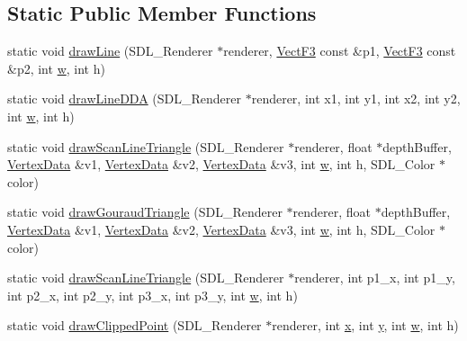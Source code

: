 \subsection*{Static Public Member Functions}
\begin{DoxyCompactItemize}
\item 
static void \hyperlink{classDrawSDLUtils_aadfa83b37031fa98575ac3bff7952865}{draw\-Line} (S\-D\-L\-\_\-\-Renderer $\ast$renderer, \hyperlink{classVectF3}{Vect\-F3} const \&p1, \hyperlink{classVectF3}{Vect\-F3} const \&p2, int \hyperlink{VectF4_8h_a56eca241e2896b9f57a79589e76fd24b}{w}, int h)
\item 
static void \hyperlink{classDrawSDLUtils_a22a6a39770fb2e7a11d66711cebf73c6}{draw\-Line\-D\-D\-A} (S\-D\-L\-\_\-\-Renderer $\ast$renderer, int x1, int y1, int x2, int y2, int \hyperlink{VectF4_8h_a56eca241e2896b9f57a79589e76fd24b}{w}, int h)
\item 
static void \hyperlink{classDrawSDLUtils_a0a92b16021d11a61ab551e9d499eabd6}{draw\-Scan\-Line\-Triangle} (S\-D\-L\-\_\-\-Renderer $\ast$renderer, float $\ast$depth\-Buffer, \hyperlink{structVertexData}{Vertex\-Data} \&v1, \hyperlink{structVertexData}{Vertex\-Data} \&v2, \hyperlink{structVertexData}{Vertex\-Data} \&v3, int \hyperlink{VectF4_8h_a56eca241e2896b9f57a79589e76fd24b}{w}, int h, S\-D\-L\-\_\-\-Color $\ast$color)
\item 
static void \hyperlink{classDrawSDLUtils_a5e512abecb18f57d2370ec0c1640b4c6}{draw\-Gouraud\-Triangle} (S\-D\-L\-\_\-\-Renderer $\ast$renderer, float $\ast$depth\-Buffer, \hyperlink{structVertexData}{Vertex\-Data} \&v1, \hyperlink{structVertexData}{Vertex\-Data} \&v2, \hyperlink{structVertexData}{Vertex\-Data} \&v3, int \hyperlink{VectF4_8h_a56eca241e2896b9f57a79589e76fd24b}{w}, int h, S\-D\-L\-\_\-\-Color $\ast$color)
\item 
static void \hyperlink{classDrawSDLUtils_ab247b5acc363924fadd62db777294115}{draw\-Scan\-Line\-Triangle} (S\-D\-L\-\_\-\-Renderer $\ast$renderer, int p1\-\_\-x, int p1\-\_\-y, int p2\-\_\-x, int p2\-\_\-y, int p3\-\_\-x, int p3\-\_\-y, int \hyperlink{VectF4_8h_a56eca241e2896b9f57a79589e76fd24b}{w}, int h)
\item 
static void \hyperlink{classDrawSDLUtils_aa97c311862620b02aab0eb7f30571381}{draw\-Clipped\-Point} (S\-D\-L\-\_\-\-Renderer $\ast$renderer, int \hyperlink{VectF4_8h_ad0da36b2558901e21e7a30f6c227a45e}{x}, int \hyperlink{VectF4_8h_aa4f0d3eebc3c443f9be81bf48561a217}{y}, int \hyperlink{VectF4_8h_a56eca241e2896b9f57a79589e76fd24b}{w}, int h)
\end{DoxyCompactItemize}


